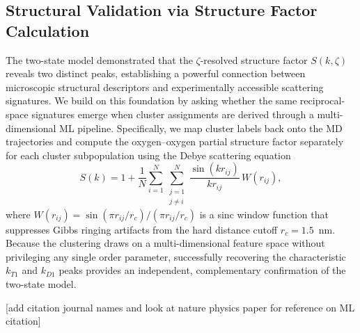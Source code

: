 \documentclass[aps, amsmath,amssymb, reprint, twocolumn, superscriptaddress]{revtex4-2}
\begin{document}
\subsection{Structural Validation via Structure Factor Calculation}
\label{sec:structure_factor}
The two-state model demonstrated that the $\zeta$-resolved structure factor $S(k,\zeta)$ reveals two distinct peaks, establishing a powerful connection between microscopic structural descriptors and experimentally accessible scattering signatures. We build on this foundation by asking whether the same reciprocal-space signatures emerge when cluster assignments are derived through a multi-dimensional ML pipeline. Specifically, we map cluster labels back onto the MD trajectories and compute the oxygen--oxygen partial structure factor separately for each cluster subpopulation using the Debye scattering equation~\cite{debye-1915}
\begin{equation}
S(k) = 1 + \frac{1}{N}\sum_{i=1}^{N}\sum_{\substack{j=1 \\ j\neq i}}^{N}\frac{\sin(k r_{ij})}{k r_{ij}}\,W(r_{ij}),
\label{eq:debye}
\end{equation}
where $W(r_{ij}) = \sin(\pi r_{ij}/r_c)/(\pi r_{ij}/r_c)$ is a sinc window function that suppresses Gibbs ringing artifacts from the hard distance cutoff $r_c = 1.5$~nm. Because the clustering draws on a multi-dimensional feature space without privileging any single order parameter, successfully recovering the characteristic $k_{T1}$ and $k_{D1}$ peaks provides an independent, complementary confirmation of the two-state model.

[add citation journal names and look at nature physics paper for reference on ML citation]

\FloatBarrier

\newpage


\end{document}

